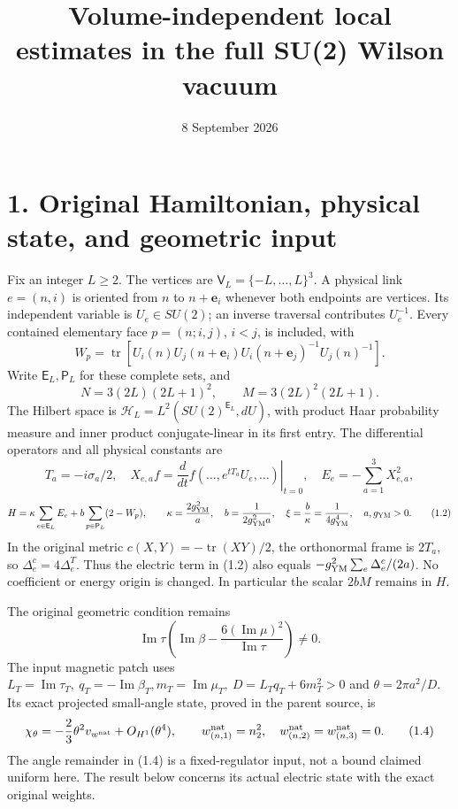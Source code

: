 \documentclass[
]{article}
\title{Volume-independent local estimates in the full SU(2) Wilson
vacuum}
\author{}
\date{8 September 2026}
\begin{document}
\maketitle

\section{1. Original Hamiltonian, physical state, and geometric
input}\label{original-hamiltonian-physical-state-and-geometric-input}

Fix an integer \(L\ge2\). The vertices are
\(\mathsf V_L=\{-L,\ldots,L\}^3\). A physical link \(e=(n,i)\) is
oriented from \(n\) to \(n+\mathbf e_i\) whenever both endpoints are
vertices. Its independent variable is \(U_e\in SU(2)\); an inverse
traversal contributes \(U_e^{-1}\). Every contained elementary face
\(p=(n;i,j)\), \(i<j\), is included, with \[
W_p=\operatorname{tr}\left[
 U_i(n)U_j(n+\mathbf e_i)U_i(n+\mathbf e_j)^{-1}U_j(n)^{-1}
\right].                                                    \tag{1.1}
\] Write \(\mathsf E_L,\mathsf P_L\) for these complete sets, and \[
N=3(2L)(2L+1)^2,\qquad M=3(2L)^2(2L+1).
\] The Hilbert space is \(\mathcal H_L=L^2(SU(2)^{\mathsf E_L},dU)\),
with product Haar probability measure and inner product conjugate-linear
in its first entry. The differential operators and all physical
constants are \[
T_a=-i\sigma_a/2,\quad
X_{e,a}f=\left.\frac{d}{dt}f(\ldots,e^{tT_a}U_e,\ldots)\right|_{t=0},
\quad E_e=-\sum_{a=1}^3X_{e,a}^2,
\] \[
H=\kappa\sum_{e\in\mathsf E_L}E_e
       +b\sum_{p\in\mathsf P_L}(2-W_p),\qquad
\kappa=\frac{2g_{\rm YM}^2}{a},\quad
b=\frac{1}{2g_{\rm YM}^2a},\quad
\xi=\frac b\kappa=\frac1{4g_{\rm YM}^4},\quad a,g_{\rm YM}>0.       \tag{1.2}
\] In the original metric \(c(X,Y)=-\operatorname{tr}(XY)/2\), the
orthonormal frame is \(2T_a\), so \(\Delta_e^c=4\Delta_e^T\). Thus the
electric term in (1.2) also equals
\(-g_{\rm YM}^2\sum_e\Delta_e^c/(2a)\). No coefficient or energy origin
is changed. In particular the scalar \(2bM\) remains in \(H\).

The original geometric condition remains \[
\operatorname{Im}\tau
\left(\operatorname{Im}\beta-
\frac{6(\operatorname{Im}\mu)^2}{\operatorname{Im}\tau}\right)\ne0.
                                                               \tag{1.3}
\] The input magnetic patch uses
\(L_T=\operatorname{Im}\tau_T,\ q_T=-\operatorname{Im}\beta_T,
m_T=\operatorname{Im}\mu_T,\ D=L_Tq_T+6m_T^2>0\) and
\(\theta=2\pi a^2/D\). Its exact projected small-angle state, proved in
the parent source, is \[
\chi_\theta=-\frac23\theta^2 v_{w^{\rm nat}}+O_{H^1}(\theta^4),
\qquad w^{\rm nat}_{(n,1)}=n_2^2,\quad
w^{\rm nat}_{(n,2)}=w^{\rm nat}_{(n,3)}=0.                         \tag{1.4}
\] The angle remainder in (1.4) is a fixed-regulator input, not a bound
claimed uniform here. The result below concerns its actual electric
state with the exact original weights.
\end{document}
